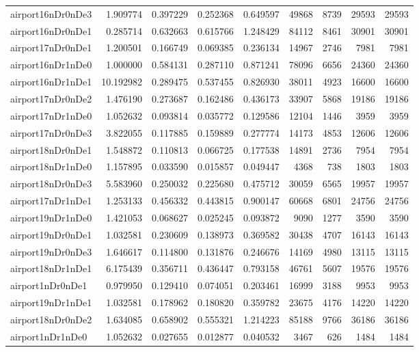 \begin{longtable}{|l|r|r|r|r|r|r|r|r|}
airport16nDr0nDe3 & 1.909774 & 0.397229 & 0.252368 & 0.649597 & 49868 & 8739 & 29593 & 29593 \\
airport16nDr0nDe1 & 0.285714 & 0.632663 & 0.615766 & 1.248429 & 84112 & 8461 & 30901 & 30901 \\
airport17nDr0nDe1 & 1.200501 & 0.166749 & 0.069385 & 0.236134 & 14967 & 2746 & 7981 & 7981 \\
airport16nDr1nDe0 & 1.000000 & 0.584131 & 0.287110 & 0.871241 & 78096 & 6656 & 24360 & 24360 \\
airport16nDr1nDe1 & 10.192982 & 0.289475 & 0.537455 & 0.826930 & 38011 & 4923 & 16600 & 16600 \\
airport17nDr0nDe2 & 1.476190 & 0.273687 & 0.162486 & 0.436173 & 33907 & 5868 & 19186 & 19186 \\
airport17nDr1nDe0 & 1.052632 & 0.093814 & 0.035772 & 0.129586 & 12104 & 1446 & 3959 & 3959 \\
airport17nDr0nDe3 & 3.822055 & 0.117885 & 0.159889 & 0.277774 & 14173 & 4853 & 12606 & 12606 \\
airport18nDr0nDe1 & 1.548872 & 0.110813 & 0.066725 & 0.177538 & 14891 & 2736 & 7954 & 7954 \\
airport18nDr1nDe0 & 1.157895 & 0.033590 & 0.015857 & 0.049447 & 4368 & 738 & 1803 & 1803 \\
airport18nDr0nDe3 & 5.583960 & 0.250032 & 0.225680 & 0.475712 & 30059 & 6565 & 19957 & 19957 \\
airport17nDr1nDe1 & 1.253133 & 0.456332 & 0.443815 & 0.900147 & 60668 & 6801 & 24756 & 24756 \\
airport19nDr1nDe0 & 1.421053 & 0.068627 & 0.025245 & 0.093872 & 9090 & 1277 & 3590 & 3590 \\
airport19nDr0nDe1 & 1.032581 & 0.230609 & 0.138973 & 0.369582 & 30438 & 4707 & 16143 & 16143 \\
airport19nDr0nDe3 & 1.646617 & 0.114800 & 0.131876 & 0.246676 & 14169 & 4980 & 13115 & 13115 \\
airport18nDr1nDe1 & 6.175439 & 0.356711 & 0.436447 & 0.793158 & 46761 & 5607 & 19576 & 19576 \\
airport1nDr0nDe1 & 0.979950 & 0.129410 & 0.074051 & 0.203461 & 16999 & 3188 & 9953 & 9953 \\
airport19nDr1nDe1 & 1.032581 & 0.178962 & 0.180820 & 0.359782 & 23675 & 4176 & 14220 & 14220 \\
airport18nDr0nDe2 & 1.634085 & 0.658902 & 0.555321 & 1.214223 & 85188 & 9766 & 36186 & 36186 \\
airport1nDr1nDe0 & 1.052632 & 0.027655 & 0.012877 & 0.040532 & 3467 & 626 & 1484 & 1484 \\

\end{longtable}
